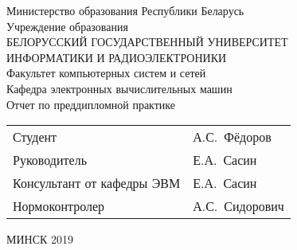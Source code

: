 \begin{titlepage}
  \begin{center}
    Министерство образования Республики Беларусь\\[1em]
    Учреждение образования\\
    БЕЛОРУССКИЙ ГОСУДАРСТВЕННЫЙ УНИВЕРСИТЕТ \\
    ИНФОРМАТИКИ И РАДИОЭЛЕКТРОНИКИ\\[1em]

    Факультет компьютерных систем и сетей \\[0.6cm]

    Кафедра электронных вычислительных машин \\[3.0cm]

    {Отчет по преддипломной практике}\\[4.2cm]

    \begin{tabular}{ p{}p{} }
      Студент & А.С.~Фёдоров  \\[1em]

      Руководитель & Е.А.~Сасин \\[1em]

      Консультант от кафедры ЭВМ & Е.А.~Сасин\\[1em]

      Нормоконтролер & А.С.~Сидорович\\
    \end{tabular}

    \vfill
    {\normalsize МИНСК 2019}
  \end{center}
\end{titlepage}
